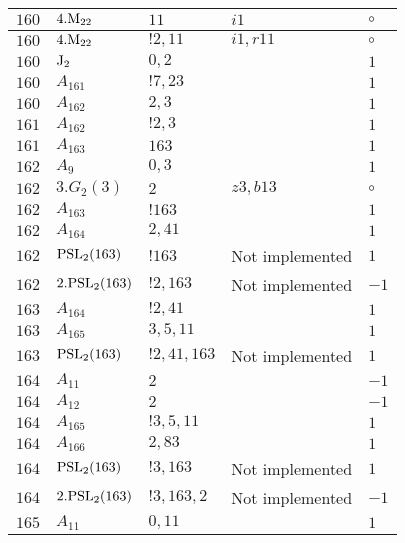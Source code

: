 \documentclass[a4paper, 11pt]{article}
\begin{document}
\begin{longtable}{lllll}
        $ 160 $ & $ 4.{\rm M}_{22} $ & $ 11 $ & $ i1 $ &  $\circ$ \\ \hline
        $ 160 $ & $ 4.{\rm M}_{22} $ & $ ! 2,11 $ & $ i1, r11 $ &  $\circ$ \\ \hline
        $ 160 $ & $ {\rm J}_2 $ & $ 0, 2 $ & $ ~ $ & $ 1$ \\ \hline
        $ 160 $ & $ A_{161} $ & $ !7, 23 $ & $ ~ $ & $ 1$ \\ \hline
        $ 160 $ & $ A_{162} $ & $ 2, 3 $ & $ ~ $ & $ 1$ \\ \hline
        $ 161 $ & $ A_{162} $ & $ !2, 3 $ & $ ~ $ & $ 1$ \\ \hline
        $ 161 $ & $ A_{163} $ & $ 163 $ & $ ~ $ & $ 1$ \\ \hline
        $ 162 $ & $ A_{9} $ & $ 0,3 $ & $ ~ $ & $ 1$ \\ \hline
        $ 162 $ & $ 3.G_{2}(3) $ & $ 2 $ & $ z3, b13 $ &  $\circ$ \\ \hline
        $ 162 $ & $ A_{163} $ & $ !163 $ & $ ~ $ & $ 1$ \\ \hline
        $ 162 $ & $ A_{164} $ & $ 2, 41 $ & $ ~ $ & $ 1$ \\ \hline
        $ 162 $ & $ {\rm PSL}_{2}(163) $ & $ !163 $ &  Not implemented & $ 1$ \\ \hline
        $ 162 $ & $ 2.{\rm PSL}_{2}(163) $ & $ !2, 163 $ &  Not implemented & $ -1$ \\ \hline
        $ 163 $ & $ A_{164} $ & $ !2, 41 $ & $ ~ $ & $ 1$ \\ \hline
        $ 163 $ & $ A_{165} $ & $ 3, 5, 11 $ & $ ~ $ & $ 1$ \\ \hline
        $ 163 $ & $ {\rm PSL}_{2}(163) $ & $ !2, 41, 163 $ &  Not implemented & $ 1$ \\ \hline
        $ 164 $ & $ A_{11} $ & $ 2 $ & $ ~ $ & $ -1$ \\ \hline
        $ 164 $ & $ A_{12} $ & $ 2 $ & $ ~ $ & $ -1$ \\ \hline
        $ 164 $ & $ A_{165} $ & $ !3, 5, 11 $ & $ ~ $ & $ 1$ \\ \hline
        $ 164 $ & $ A_{166} $ & $ 2, 83 $ & $ ~ $ & $ 1$ \\ \hline
        $ 164 $ & $ {\rm PSL}_{2}(163) $ & $ !3, 163 $ &  Not implemented & $ 1$ \\ \hline
        $ 164 $ & $ 2.{\rm PSL}_{2}(163) $ & $ !3, 163, 2 $ &  Not implemented & $ -1$ \\ \hline
        $ 165 $ & $ A_{11} $ & $ 0,11 $ & $ ~ $ & $ 1$ \\ \hline

\end{longtable}
\end{document}
